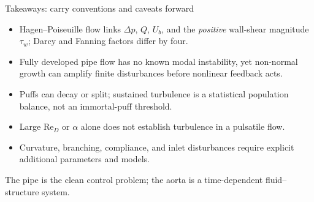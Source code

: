 \documentclass[aspectratio=169,11pt]{beamer}
\newcommand{\Rey}{\mathrm{Re}}
\begin{document}
\begin{frame}{Takeaways: carry conventions and caveats forward}
\begin{itemize}\itemsep5pt
  \item Hagen--Poiseuille flow links $\Delta p$, $Q$, $U_b$, and the \emph{positive} wall-shear magnitude $\tau_w$; Darcy and Fanning factors differ by four.
  \item Fully developed pipe flow has no known modal instability, yet non-normal growth can amplify finite disturbances before nonlinear feedback acts.
  \item Puffs can decay or split; sustained turbulence is a statistical population balance, not an immortal-puff threshold.
  \item Large $\Rey_D$ or $\alpha$ alone does not establish turbulence in a pulsatile flow.
  \item Curvature, branching, compliance, and inlet disturbances require explicit additional parameters and models.
\end{itemize}

\begin{punchbox}
\centering
The pipe is the clean control problem; the aorta is a time-dependent fluid--structure system.
\end{punchbox}
\end{frame}
\end{document}
